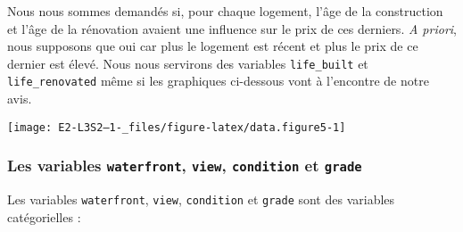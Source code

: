 \documentclass[
  11pt,
  french,
]{article}
\newenvironment{Shaded}{\begin{snugshade}}{\end{snugshade}}
\newcommand{\KeywordTok}[1]{\textcolor[rgb]{0.13,0.29,0.53}{\textbf{#1}}}
\newcommand{\NormalTok}[1]{#1}
\newcommand{\OperatorTok}[1]{\textcolor[rgb]{0.81,0.36,0.00}{\textbf{#1}}}
\newcommand{\StringTok}[1]{\textcolor[rgb]{0.31,0.60,0.02}{#1}}
\begin{document}
Nous nous sommes demandés si, pour chaque logement, l'âge de la
construction et l'âge de la rénovation avaient une influence sur le prix
de ces derniers. \textit{A priori}, nous supposons que oui car plus le
logement est récent et plus le prix de ce dernier est élevé. Nous nous
servirons des variables \texttt{life\_built} et \texttt{life\_renovated}
même si les graphiques ci-dessous vont à l'encontre de notre avis.

\begin{center}\texttt{[image: E2-L3S2--1-\_files/figure-latex/data.figure5-1]} \end{center}

\newpage

\hypertarget{les-variables-waterfront-view-condition-et-grade}{%
\subsubsection{\texorpdfstring{Les variables \texttt{waterfront},
\texttt{view}, \texttt{condition} et
\texttt{grade}}{Les variables waterfront, view, condition et grade}}\label{les-variables-waterfront-view-condition-et-grade}}

Les variables \texttt{waterfront}, \texttt{view}, \texttt{condition} et
\texttt{grade} sont des variables catégorielles :

\begin{Shaded}
\end{Shaded}
\end{document}
